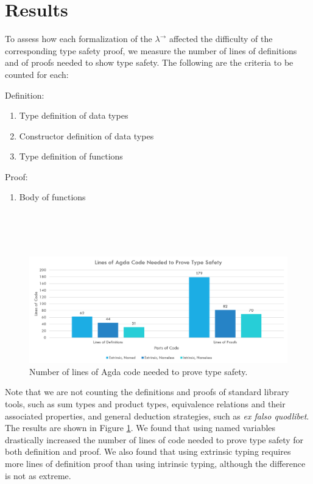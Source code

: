 \documentclass[12pt, letterpaper]{article}
\begin{document}
\section{Results}
To assess how each formalization of the $\lambda^{\to}$ affected the difficulty of the corresponding type safety proof, we measure the number of lines of definitions and of proofs needed to show type safety. The following are the criteria to be counted for each:
\clearpage
\begin{flushleft}
\begin{multicols}{2}
Definition:
\begin{enumerate}
	\item Type definition of data types
	\item Constructor definition of data types
	\item Type definition of functions
\end{enumerate}
Proof:
\begin{enumerate}
	\item Body of functions
\end{enumerate}
$\text{ }$\\
$\text{ }$\\
$\text{ }$\\
\end{multicols}
\end{flushleft}
\begin{figure}
\centering
\includegraphics[scale=0.6]{results}
\caption{Number of lines of Agda code needed to prove type safety.}
\label{fig:results}
\end{figure}
Note that we are not counting the definitions and proofs of standard library tools, such as sum types and product types, equivalence relations and their associated properties, and general deduction strategies, such as \textit{ex falso quodlibet}. The results are shown in Figure \ref{fig:results}. We found that using named variables drastically increased the number of lines of code needed to prove type safety for both definition and proof. We also found that using extrinsic typing requires more lines of definition proof than using intrinsic typing, although the difference is not as extreme. 
\end{document}
